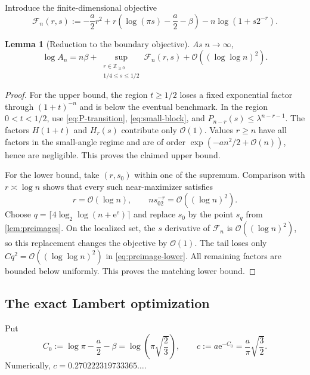 \documentclass[11pt,oneside]{article}
\newtheorem{lemma}[theorem]{Lemma}
\theoremstyle{definition}
\theoremstyle{remark}
\newcommand{\Z}{\mathbb Z}
\newcommand{\e}{\mathrm e}
\newcommand{\bigO}{\mathcal O}
\begin{document}
Introduce the finite-dimensional objective
\begin{equation}
 \mathcal F_n(r,s):=
 -\frac a2r^2
 +r\left(\log(\pi s)-\frac a2-\beta\right)
 -n\log(1+s2^{-r}).
 \label{eq:Fn}
\end{equation}

\begin{lemma}[Reduction to the boundary objective]
\label{lem:An-reduction}
As $n\to\infty$,
\begin{equation}
 \log A_n
 =n\beta+
 \sup_{\substack{r\in\Z_{\ge0}\\1/4\le s\le1/2}}
 \mathcal F_n(r,s)
 +\bigO((\log\log n)^2).
 \label{eq:An-reduction}
\end{equation}
\end{lemma}

\begin{proof}
For the upper bound, the region $t\ge1/2$ loses a fixed exponential factor
through $(1+t)^{-n}$ and is below the eventual benchmark.  In the region
$0<t<1/2$, use \eqref{eq:P-transition}, \eqref{eq:small-block}, and
$P_{n-r}(s)\le\lambda^{n-r-1}$.  The factors $H(1+t)$ and $H_r(s)$ contribute
only $\bigO(1)$.  Values $r\ge n$ have all factors in the small-angle regime
and are of order $\exp(-an^2/2+\bigO(n))$, hence are negligible.  This proves
the claimed upper bound.

For the lower bound, take $(r,s_0)$ within one of the supremum.  Comparison
with $r\asymp\log n$ shows that every such near-maximizer satisfies
\begin{equation}
 r=\bigO(\log n),
 \qquad
 ns_02^{-r}=\bigO((\log n)^2).
 \label{eq:localization}
\end{equation}
Choose
$q=\lceil4\log_2\log(n+\e^\e)\rceil$ and replace $s_0$ by the point $s_q$
from \cref{lem:preimages}.  On the localized set, the $s$ derivative of
$\mathcal F_n$ is $\bigO((\log n)^2)$, so this replacement changes the
objective by $\bigO(1)$.  The tail loses only
$Cq^2=\bigO((\log\log n)^2)$ in \eqref{eq:preimage-lower}.  All remaining
factors are bounded below uniformly.  This proves the matching lower bound.
\end{proof}

\subsection{The exact Lambert optimization}

Put
\begin{equation}
 C_0:=\log\pi-\frac a2-\beta
 =\log\!\left(\pi\sqrt{\frac23}\right),
 \qquad
 c:=a\e^{-C_0}=\frac a\pi\sqrt{\frac32}.
 \label{eq:c-Lambert}
\end{equation}
Numerically, $c=0.270222319733365\ldots$.
\end{document}
